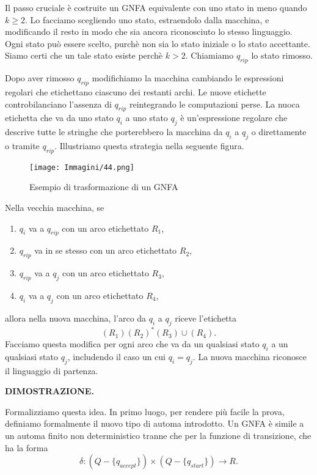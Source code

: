 \documentclass{article}
\begin{document}
Il passo cruciale è costruite un GNFA equivalente con uno stato in meno quando $k \geq 2$.
Lo facciamo scegliendo uno stato, estraendolo dalla macchina, e modificando il resto in modo che sia ancora riconosciuto lo stesso linguaggio.
Ogni stato può essere scelto, purchè non sia lo stato iniziale o lo stato accettante. Siamo certi che un tale stato esiste perchè $k > 2$.
Chiamiamo $q_{rip}$ lo stato rimosso.

Dopo aver rimosso $q_{rip}$ modifichiamo la macchina cambiando le espressioni regolari che etichettano ciascuno dei restanti archi.
Le nuove etichette controbilanciano l'assenza di $q_{rip}$ reintegrando le computazioni perse.
La nuoca etichetta che va da uno stato $q_i$ a uno stato $q_j$ è un'espressione regolare che descrive tutte le stringhe che porterebbero la macchina da $q_i$ a $q_j$ o direttamente o tramite $q_{rip}$.
Illustriamo questa strategia nella seguente figura.

\begin{figure}[H]
    \centering
    \texttt{[image: Immagini/44.png]}
    \caption{Esempio di trasformazione di un GNFA}
    \label{fig:gnfa_example}
\end{figure}

Nella vecchia macchina, se

\begin{enumerate}
    \item $q_{i}$ va a $q_{rip}$ con un arco etichettato $R_1$,
    \item $q_{rip}$ va in se stesso con un arco etichettato $R_2$,
    \item $q_{rip}$ va a $q_j$ con un arco etichettato $R_3$,
    \item $q_i$ va a $q_j$ con un arco etichettato $R_4$,
\end{enumerate}
allora nella nuova macchina, l'arco da $q_i$ a $q_j$ riceve l'etichetta
$$(R_1)(R_2)^* (R_3)\cup (R_4).$$
Facciamo questa modifica per ogni arco che va da un qualsiasi stato $q_i$ a un qualsiasi stato $q_j$, includendo il caso un cui $q_i = q_j$.
La nuova macchina riconosce il linguaggio di partenza.
\vspace{1em}

\textbf{DIMOSTRAZIONE.}

Formalizziamo questa idea.
In primo luogo, per rendere più facile la prova, definiamo formalmente il nuovo tipo di automa introdotto.
Un GNFA è simile a un automa finito non deterministico tranne che per la funzione di transizione, che ha la forma
$$ \delta : (Q - \{q_{accept} \}) \times (Q- \{q_{start} \}) \rightarrow R.$$
\end{document}
